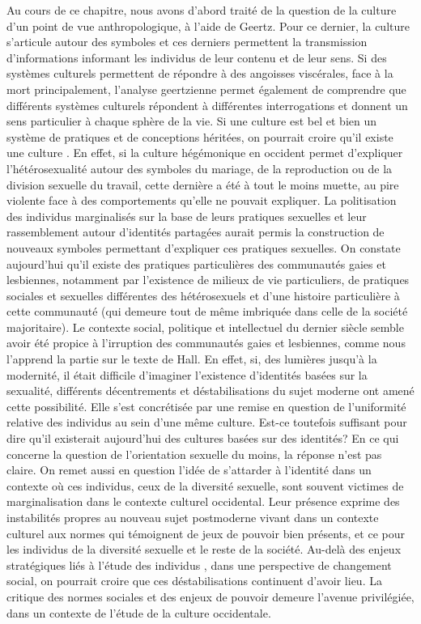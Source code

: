 Au cours de ce chapitre, nous avons d'abord traité de la question de la culture d'un point de vue anthropologique, à l'aide de Geertz.
Pour ce dernier, la culture s'articule autour des symboles et ces derniers permettent la transmission d'informations informant les individus de leur contenu et de leur sens.
Si des systèmes culturels permettent de répondre à des angoisses viscérales, face à la mort principalement, l'analyse geertzienne permet également de comprendre que différents systèmes culturels répondent à différentes interrogations et donnent un sens particulier à chaque sphère de la vie.
Si une culture est bel et bien un système de pratiques et de conceptions héritées, on pourrait croire qu'il existe une culture \lgbt{}.
En effet, si la culture hégémonique en occident permet d'expliquer l'hétérosexualité autour des symboles du mariage, de la reproduction ou de la division sexuelle du travail, cette dernière a été à tout le moins muette, au pire violente face à des comportements qu'elle ne pouvait expliquer.
La politisation des individus marginalisés sur la base de leurs pratiques sexuelles et leur rassemblement autour d'identités partagées aurait permis la construction de nouveaux symboles permettant d'expliquer ces pratiques sexuelles.
On constate aujourd'hui qu'il existe des pratiques particulières des communautés gaies et lesbiennes, notamment par l'existence de milieux de vie particuliers, de pratiques sociales et sexuelles différentes des hétérosexuels et d'une histoire particulière à cette communauté (qui demeure tout de même imbriquée dans celle de la société majoritaire).
Le contexte social, politique et intellectuel du dernier siècle semble avoir été propice à l'irruption des communautés gaies et lesbiennes, comme nous l'apprend la partie sur le texte de Hall.
En effet, si, des lumières jusqu'à la modernité, il était difficile d'imaginer l'existence d'identités basées sur la sexualité, différents décentrements et déstabilisations du sujet moderne ont amené cette possibilité.
Elle s'est concrétisée par une remise en question de l'uniformité relative des individus au sein d'une même culture.
Est-ce toutefois suffisant pour dire qu'il existerait aujourd'hui des cultures basées sur des identités?
En ce qui concerne la question de l'orientation sexuelle du moins, la réponse n'est pas claire.
On remet aussi en question l'idée de s'attarder à l'identité dans un contexte où ces individus, ceux de la diversité sexuelle, sont souvent victimes de marginalisation dans le contexte culturel occidental.
Leur présence exprime des instabilités propres au nouveau sujet postmoderne vivant dans un contexte culturel aux normes qui témoignent de jeux de pouvoir bien présents, et ce pour les individus de la diversité sexuelle et le reste de la société.
Au-delà des enjeux stratégiques liés à l'étude des individus \lgbt{}, dans une perspective de changement social, on pourrait croire que ces déstabilisations continuent d'avoir lieu.
La critique des normes sociales et des enjeux de pouvoir demeure l'avenue privilégiée, dans un contexte de l'étude de la culture occidentale.

